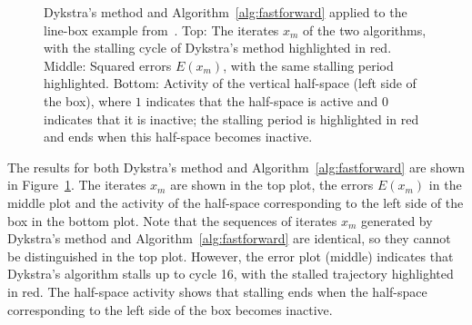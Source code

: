 \documentclass[onecolumn]{autart}
\begin{document}
\begin{figure}[b]
    \caption{Dykstra's method and Algorithm~\ref{alg:fastforward} applied to the line-box example from~\cite{BAUSCHKESWISS}. Top: The iterates $x_m$ of the two algorithms, with the stalling cycle of Dykstra's method highlighted in red. Middle: Squared errors $E(x_m)$, with the same stalling period highlighted. Bottom: Activity of the vertical half-space (left side of the box), where $1$ indicates that the half-space is active and $0$ indicates that it is inactive; the stalling period is highlighted in red and ends when this half-space becomes inactive.}
    \label{fig:stalling2}
\end{figure}

The results for both Dykstra's method and Algorithm~\ref{alg:fastforward} are shown in Figure~\ref{fig:stalling2}. The iterates $x_m$ are shown in the top plot, the errors $E(x_m)$ in the middle plot and the activity of the half-space corresponding to the left side of the box in the bottom plot. Note that the sequences of iterates $x_m$ generated by Dykstra's method and Algorithm~\ref{alg:fastforward} are identical, so they cannot be distinguished in the top plot. However, the error plot (middle) indicates that Dykstra's algorithm stalls up to cycle 16, with the stalled trajectory highlighted in red. The half-space activity shows that stalling ends when the half-space corresponding to the left side of the box becomes inactive.
\end{document}

